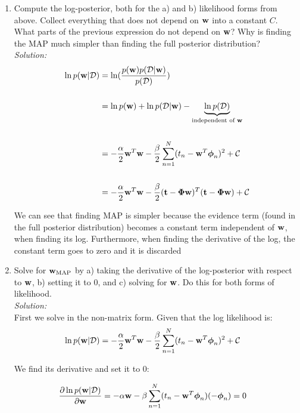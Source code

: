 \documentclass[12pt,a4paper]{article}
\newcommand{\Data}{\mathcal{D}}
\newcommand{\DataIndex}{n}
\newcommand{\tscalar}{t}
\newcommand{\tvec}{{\bf \tscalar}}
\newcommand{\wscalar}{w}
\newcommand{\wvec}{{\bf \wscalar}}
\newcommand{\wvecMAP}{\wvec_{\text{MAP}}}
\newcommand{\tn}{\tscalar_{\DataIndex}}
\newcommand{\phivec}{\boldsymbol{\phi}}
\newcommand{\Phimat}{\boldsymbol{\Phi}}
\newcommand{\phivecn}{\phivec_{\DataIndex}}
\begin{document}
\begin{enumerate}
  \item Compute the log-posterior, both for the a) and b) likelihood forms from above.  Collect everything that does not depend on $\wvec$ into a constant $C$.  What parts of the previous expression do not depend on $\wvec$?  Why is finding the MAP much simpler than finding the full posterior distribution? \\
	  \emph{Solution:} \\
		  \begin{align*}
		  \ln p(\wvec | \Data) &= \ln (\frac{p(\wvec) p(\mathcal{D} | \wvec) }{p(\Data)}) \\ \\
		  &= \ln p(\wvec) + \ln p(\mathcal{D} | \wvec) - \underbrace{\ln p(\Data)}_{\text{independent of \wvec}} \\ \\
		  &= - \frac{\alpha}{2} \wvec^T \wvec - \frac{\beta}{2} \sum_{n=1}^{N}(\tn - \wvec^T \phivecn)^{2} + \mathcal{C} \\ \\
		  &= - \frac{\alpha}{2} \wvec^T \wvec - \frac{\beta}{2} (\tvec - \Phimat \wvec)^{T} (\tvec - \Phimat \wvec) + \mathcal{C}
		  \end{align*}
		  
		  We can see that finding MAP is simpler because the evidence term (found in the full posterior distribution) becomes a constant term independent of $\wvec$, when finding its log. Furthermore, when finding the derivative of the log, the constant term goes to zero and it is discarded\\
  
  \item Solve for $\wvecMAP$ by a) taking the derivative of the log-posterior with respect to $\wvec$, b) setting it to 0, and c) solving for $\wvec$.  Do this for both forms of likelihood.\\
	  \emph{Solution:} \\
		  First we solve in the non-matrix form. Given that the log likelihood is: \\
		  \begin{align*}
		  \ln p(\wvec | \Data) &= - \frac{\alpha}{2} \wvec^T \wvec - \frac{\beta}{2} \sum_{n=1}^{N}(\tn- \wvec^T \phivecn)^{2} + \mathcal{C} 			\end{align*}
		  
		  We find its derivative and set it to $0$:
		  
		  \begin{align*}
		  \frac{\partial \ln p(\wvec | \Data)}{\partial \wvec} &= - \alpha \wvec - \beta \sum_{n=1}^{N} (\tn- \wvec^T \phivecn)(-\phivecn) = 0 
		  \end{align*}
		  

\end{enumerate}
\end{document}
